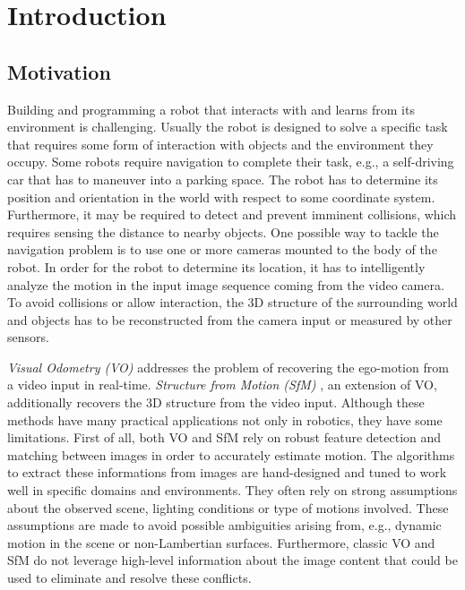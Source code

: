 \chapter{Introduction}
		
	\section{Motivation}
		
		Building and programming a robot that interacts with and learns from its environment is challenging.
		Usually the robot is designed to solve a specific task that requires some form of interaction with objects and the environment they occupy.
		Some robots require navigation to complete their task, e.g., a self-driving car that has to maneuver into a parking space.
		The robot has to determine its position and orientation in the world with respect to some coordinate system.
		Furthermore, it may be required to detect and prevent imminent collisions, which requires sensing the distance to nearby objects.
		One possible way to tackle the navigation problem is to use one or more cameras mounted to the body of the robot.
		In order for the robot to determine its location, it has to intelligently analyze the motion in the input image sequence coming from the video camera.
		To avoid collisions or allow interaction, the 3D structure of the surrounding world and objects has to be reconstructed from the camera input or measured by other sensors.
		
		\emph{Visual Odometry (VO)}  addresses the problem of recovering the ego-motion from a video input in real-time. 
		\emph{Structure from Motion (SfM)} , an extension of VO, additionally recovers the 3D structure from the video input.
		Although these methods have many practical applications not only in robotics, they have some limitations.
		First of all, both VO and SfM rely on robust feature detection and matching between images in order to accurately estimate motion.
		The algorithms to extract these informations from images are hand-designed and tuned to work well in specific domains and environments.
		They often rely on strong assumptions about the observed scene, lighting conditions or type of motions involved.
		These assumptions are made to avoid possible ambiguities arising from, e.g., dynamic motion in the scene or non-Lambertian surfaces.
		Furthermore, classic VO and SfM do not leverage high-level information about the image content that could be used to eliminate and resolve these conflicts.
		
